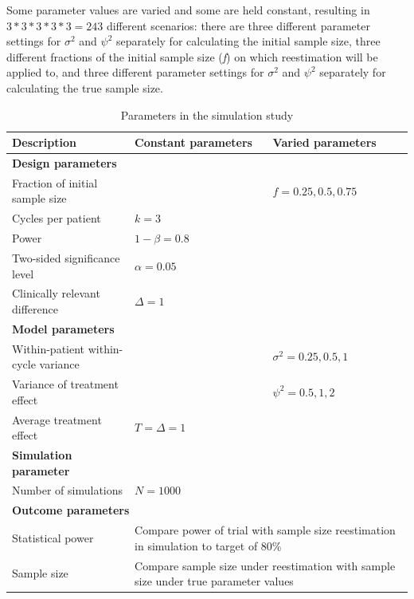 \documentclass[11pt]{article}
\begin{document}
Some parameter values are varied and some are held constant, resulting in $3*3*3*3*3=243$ different scenarios: there are three different parameter settings for $\sigma^2$ and $\psi^2$ separately for calculating the initial sample size, three different fractions of the initial sample size (\textit{f}) on which reestimation will be applied to, and three different parameter settings for $\sigma^2$ and $\psi^2$ separately for calculating the true sample size.  \\

\begin{table}[h]
\begin{center}
\caption{Parameters in the simulation study}
\begin{tabular}{p{6cm}p{4cm}p{4cm}}
\hline
Description & Constant parameters & Varied parameters \\
\hline 
\textbf{Design parameters} & & \\
Fraction of initial sample size & & $f = 0.25, 0.5, 0.75$ \\
Cycles per patient & $k = 3$ & \\
Power & $1 - \beta = 0.8$ & \\
Two-sided significance level & $\alpha = 0.05$ & \\
Clinically relevant difference & $\Delta = 1$ & \\
\textbf{Model parameters} & & \\
Within-patient within-cycle variance & & $\sigma^2 = 0.25, 0.5, 1$ \\
Variance of treatment effect & & $\psi^2 = 0.5, 1, 2$ \\
Average treatment effect & $T = \Delta = 1$ & \\
\textbf{Simulation parameter} & & \\
Number of simulations & $N = 1000$ & \\
\hline 
\multicolumn{3}{l}{\textbf{Outcome parameters}} \\
Statistical power & \multicolumn{2}{p{8cm}}{Compare power of trial with sample size reestimation in simulation to target of 80\%}\\
Sample size & \multicolumn{2}{p{8cm}}{Compare sample size under reestimation with sample size under true parameter values} \\
\hline 
\end{tabular}
\label{tab:T1}
\end{center}
\end{table} 
\end{document}
